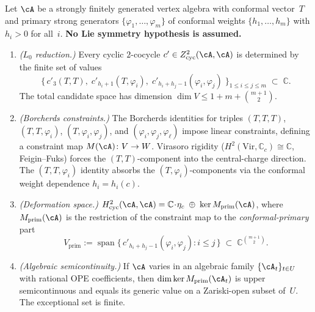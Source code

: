 \begin{theorem}
\label{thm:conformal-bootstrap-rigidity}
Let $\cA$ be a strongly finitely generated vertex algebra with
conformal vector~$T$ and primary strong generators
$\{\varphi_1, \ldots, \varphi_m\}$ of conformal weights
$\{h_1, \ldots, h_m\}$ with $h_i > 0$ for all~$i$.
\textbf{No Lie symmetry hypothesis is assumed.}
\begin{enumerate}[label=\textup{(\roman*)}]
\item \emph{\textup{(}$L_0$ reduction.\textup{)}}
  Every cyclic $2$-cocycle $c' \in Z^2_{\mathrm{cyc}}(\cA, \cA)$
  is determined by the finite set of values
  \begin{equation}\label{eq:l0-finite-data}
  \bigl\{\,
  c'_3(T, T),\;
  c'_{h_i+1}(T, \varphi_i),\;
  c'_{h_i+h_j-1}(\varphi_i, \varphi_j)
  \;\bigr\}_{1 \leq i \leq j \leq m}
  \;\subset\; \mathbb{C}.
  \end{equation}
  The total candidate space has dimension
  $\dim V \leq 1 + m + \binom{m+1}{2}$.
\item \emph{\textup{(}Borcherds constraints.\textup{)}}
  The Borcherds identities for triples
  $(T, T, T)$, $(T, T, \varphi_i)$,
  $(T, \varphi_i, \varphi_j)$, and
  $(\varphi_i, \varphi_j, \varphi_\ell)$
  impose linear constraints, defining a constraint map
  $M(\cA)\colon V \to W$.
  Virasoro rigidity
  \textup{(}$H^2(\mathrm{Vir}, \mathbb{C}_c) \cong \mathbb{C}$,
  Feigin--Fuks\textup{)} forces the
  $(T,T)$-component into the central-charge direction.
  The $(T, T, \varphi_i)$ identity absorbs the
  $(T, \varphi_i)$-components via the conformal weight
  dependence $h_i = h_i(c)$.
\item \emph{\textup{(}Deformation space.\textup{)}}
  $H^2_{\mathrm{cyc}}(\cA, \cA) =
  \mathbb{C}\!\cdot\!\eta_c \;\oplus\; \ker M_{\mathrm{prim}}(\cA)$,
  where $M_{\mathrm{prim}}(\cA)$ is the restriction of the
  constraint map to the \emph{conformal-primary} part
  \begin{equation}\label{eq:conformal-primary-part}
  V_{\mathrm{prim}}
  := \operatorname{span}\bigl\{\,
  c'_{h_i+h_j-1}(\varphi_i, \varphi_j) : i \leq j
  \,\bigr\}
  \;\subset\; \mathbb{C}^{\binom{m+1}{2}}.
  \end{equation}
\item \emph{\textup{(}Algebraic semicontinuity.\textup{)}}
  If\/ $\cA$ varies in an algebraic family
  $\{\cA_t\}_{t \in U}$ with rational OPE coefficients,
  then $\dim \ker M_{\mathrm{prim}}(\cA_t)$ is upper semicontinuous
  and equals its generic value on a Zariski-open subset of\/~$U$.
  The exceptional set is finite.
\end{enumerate}
\end{theorem}

